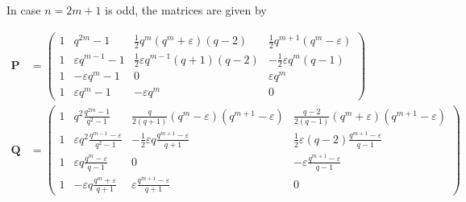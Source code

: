 \documentclass[a4paper]{article}
\theoremstyle{definition}
\newcommand{\eps}{\varepsilon}
\begin{document}
In case $n=2m+1$ is odd, the matrices are given by

\begin{align*}
 \mathbf P & = \begin{pmatrix}
  1 & q^{2m}-1 & \frac12 q^m \left( q^m + \eps \right)(q-2) & \frac12 q^{m+1} \left(q^m- \eps \right) \\[0.5em]
  1 & \eps q^{m-1} - 1 & \frac12 \eps q^{m-1} (q+1)(q-2) & - \frac12 \eps q^m (q-1) \\[0.5em]
  1 & -\eps q^m - 1 & 0 & \eps q^m \\[0.5em]
  1 & \eps q^m -1 & -\eps q^m & 0
 \end{pmatrix} \\
 \mathbf Q &= \begin{pmatrix}
 1 & q^2 \frac{ q^{2m}-1 }{ q^2-1 } & \frac{q}{2(q+1)} \left( q^{m} - \eps \right) \left( q^{m+1} - \eps\right) & \frac{q-2}{2(q-1)}\left( q^m + \eps \right) \left( q^{m+1} - \eps \right) \\[0.5em]
 1 & \eps  q^2 \frac{q^{m-1} - \eps}{q^2-1} & -\frac12 \eps q \frac{q^{m+1} - \eps}{q+1} & \frac12 \eps (q-2) \frac{q^{m+1} - \eps}{q-1} \\[0.5em]
 1 & \eps q \frac{q^m - \eps}{q-1} & 0 & -\eps \frac{q^{m+1} - \eps}{q-1} \\[0.5em]
 1 & -\eps q \frac{q^m + \eps}{q+1} & \eps \frac{q^{m+1} - \eps}{q+1} & 0
 \end{pmatrix}
\end{align*}
\end{document}
